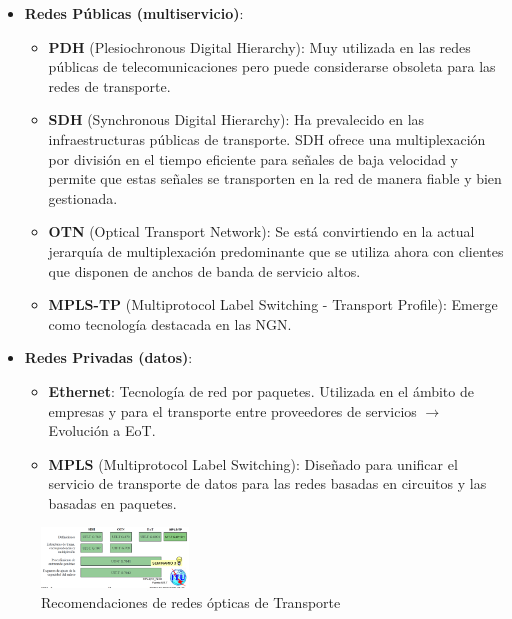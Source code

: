 \documentclass[10pt,portrait, twocolumn]{article}
\begin{document}
\begin{itemize}
\item \textbf{Redes Públicas (multiservicio)}:
	\begin{itemize}
		\item \textbf{PDH} (Plesiochronous Digital Hierarchy): Muy utilizada en las redes públicas de telecomunicaciones pero puede considerarse obsoleta para las redes de transporte.
		\item \textbf{SDH} (Synchronous Digital Hierarchy): Ha prevalecido en las infraestructuras públicas de transporte. SDH ofrece una multiplexación por división en el tiempo eficiente para señales de baja velocidad y permite que estas señales se transporten en la red de manera fiable y bien gestionada.
		\item \textbf{OTN} (Optical Transport Network): Se está convirtiendo en la actual jerarquía de multiplexación predominante que se utiliza ahora con clientes que disponen de anchos de banda de servicio altos.
		\item \textbf{MPLS-TP} (Multiprotocol Label Switching - Transport Profile): Emerge como tecnología destacada en las NGN.
	\end{itemize}
	
\item \textbf{Redes Privadas (datos)}:

	\begin{itemize}
		\item \textbf{Ethernet}: Tecnología de red por paquetes. Utilizada en el ámbito de empresas y para el transporte entre proveedores de servicios $\rightarrow$ Evolución a EoT.
		\item \textbf{MPLS} (Multiprotocol Label Switching): Diseñado para unificar el servicio de transporte de datos para las redes basadas en circuitos y las basadas en paquetes.
	\end{itemize}
\end{itemize}
 
\begin{figure}[ht]
	\centering
     \includegraphics[width=0.35\textwidth]{Recomendaciones}
      \caption{Recomendaciones de redes ópticas de Transporte}
      \label{fig:Regiones de frecuencias}
  \end{figure}
 
\end{document}
